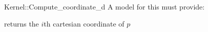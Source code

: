 \begin{ccRefFunctionObjectConcept}{Kernel::Compute_coordinate_d}
A model for this must provide:


 {returns the $i$th cartesian coordinate of $p$}

\end{ccRefFunctionObjectConcept}
